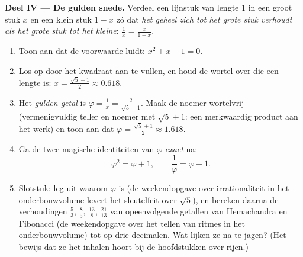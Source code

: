\begin{problem}[{Weekendopgave --- som-en-productvraagstukken, het kwadraat
aanvullen zoals al-Chwarizmi het tekende, en de vergelijking
$x^2 = x + 1$}]
\medskip
\noindent\textbf{Deel IV --- De gulden snede.}
Verdeel een lijnstuk van lengte $1$ in een groot stuk $x$ en een klein stuk
$1 - x$ zó dat \emph{het geheel zich tot het grote stuk verhoudt als het
grote stuk tot het kleine}: $\frac{1}{x} = \frac{x}{1 - x}$.
\begin{enumerate}[resume]
  \item Toon aan dat de voorwaarde luidt: $x^2 + x - 1 = 0$.
  \item Los op door het kwadraat aan te vullen, en houd de wortel over die
        een lengte is: $x = \frac{\sqrt5 - 1}{2} \approx 0.618$.
  \item Het \emph{gulden getal} is $\varphi = \frac1x =
        \frac{2}{\sqrt5 - 1}$. Maak de noemer wortelvrij (vermenigvuldig
        teller en noemer met $\sqrt5 + 1$: een merkwaardig product aan het
        werk) en toon aan dat $\varphi = \frac{\sqrt5 + 1}{2} \approx 1.618$.
  \item Ga de twee magische identiteiten van $\varphi$ \emph{exact} na:
        \[
        \varphi^2 = \varphi + 1,
        \qquad
        \frac{1}{\varphi} = \varphi - 1 .
        \]
  \item Slotstuk: leg uit waarom $\varphi$  is (de weekendopgave
        over irrationaliteit in het onderbouwvolume levert het sleutelfeit
        over $\sqrt5$), en bereken daarna de verhoudingen $\frac53$,
        $\frac85$, $\frac{13}{8}$, $\frac{21}{13}$ van opeenvolgende
        getallen van Hemachandra en Fibonacci (de weekendopgave over het
        tellen van ritmes in het onderbouwvolume) tot op drie decimalen. Wat
        lijken ze na te jagen? (Het bewijs dat ze het inhalen hoort bij de
        hoofdstukken over rijen.)
\end{enumerate}
\end{problem}
